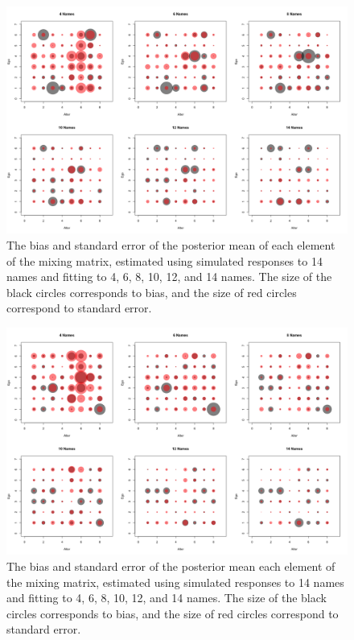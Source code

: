 \begin{figure}
\includegraphics[width=\textwidth]{figures/kernel/matrix/bias_var_1.png}
\caption{The bias and standard error of the posterior mean of each element of the mixing matrix, estimated using simulated responses to 14 names and fitting to 4, 6, 8, 10, 12, and 14 names. The size of the black circles corresponds to bias, and the size of red circles correspond to standard error.}
\label{fig:mixing_matrix_bias_var_1}
\end{figure}

\begin{figure}
\includegraphics[width=\textwidth]{figures/kernel/matrix/bias_var_3.png}
\caption{The bias and standard error of the posterior mean each element of the mixing matrix, estimated using simulated responses to 14 names and fitting to 4, 6, 8, 10, 12, and 14 names. The size of the black circles corresponds to bias, and the size of red circles correspond to standard error.}
\label{fig:mixing_matrix_bias_var_2}
\end{figure}


